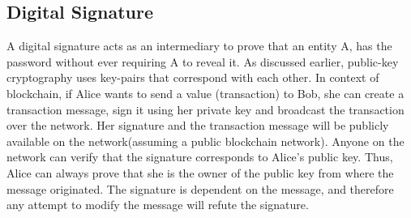 %

\subsection{Digital Signature} \label{ss:digitalsignature}
A digital signature acts as an intermediary to prove that an entity A, has the
password without ever requiring A to reveal it. As discussed earlier,
public-key cryptography uses key-pairs that correspond with each other. In
context of blockchain, if Alice wants to send a value (transaction) to Bob, she
can create a transaction message, sign it using her private key and broadcast
the transaction over the network. Her signature and the transaction message
will be publicly available on the network(assuming a public blockchain
network). Anyone on the network can verify that the signature corresponds to
Alice's public key. Thus, Alice can always prove that she is the owner of the
public key from where the message originated. The signature is dependent on the
message, and therefore any attempt to modify the message will refute the
signature.

